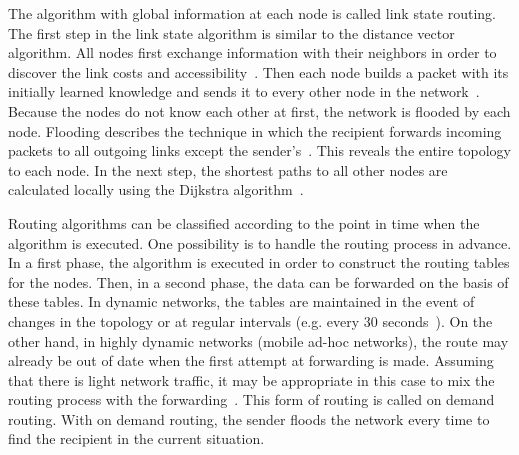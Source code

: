 \documentclass[english,version-2019-11]{uzl-thesis}
\begin{document}
The algorithm with global information at each node
is called link state routing. The first step
in the link state algorithm is similar to
the distance vector algorithm. All nodes first exchange
information with their neighbors in order to
discover the link costs and accessibility~\cite{Tanenbaum}.
Then each node builds a packet with its initially
learned knowledge and sends it to every other
node in the network~\cite{Tanenbaum}. Because the nodes do not
know each other at first, the network is flooded
by each node. Flooding describes the technique
in which the recipient forwards incoming packets
to all outgoing links except the sender's~\cite{Tanenbaum}.
This reveals the entire topology to each node.
In the next step, the shortest paths to all other
nodes are calculated locally using
the Dijkstra algorithm~\cite{Tanenbaum}.

Routing algorithms can be classified according
to the point in time when the algorithm is executed.
One possibility is to handle the routing process
in advance. In a first phase, the algorithm is executed
in order to construct the routing tables for the nodes.
Then, in a second phase, the data can be forwarded
on the basis of these tables. In dynamic networks,
the tables are maintained in the event of changes
in the topology or at regular intervals
(e.g. every 30 seconds~\cite{Schiller}).
On the other hand, in highly dynamic networks
(mobile ad-hoc networks), the route may already be
out of date when the first attempt at forwarding is made.
Assuming that there is light network traffic,
it may be appropriate in this case to mix the
routing process with the forwarding~\cite{Schiller}.
This form of routing is called on demand routing.
With on demand routing, the sender floods the network
every time to find the recipient in the current situation.
\end{document}
